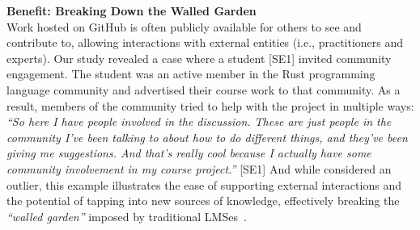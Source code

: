 \textbf{Benefit: Breaking Down the Walled Garden} \\
Work hosted on GitHub is often publicly available for others to see and contribute to, allowing interactions with external entities (i.e., practitioners and experts). Our study revealed a case where a student [SE1] invited community engagement. The student was an active member in the Rust programming language community and advertised their course work to that community. As a result, members of the community tried to help with the project in multiple ways: \textit{``So here I have people involved in the discussion. These are just people in the community I've been talking to about how to do different things, and they've been giving me suggestions. And that's really cool because I actually have some community involvement in my course project.''} [SE1] And while considered an outlier, this example illustrates the ease of supporting external interactions and the potential of tapping into new sources of knowledge, effectively breaking the \textit{``walled garden''} imposed by traditional LMSes~\cite{mott2010envisioning}.



